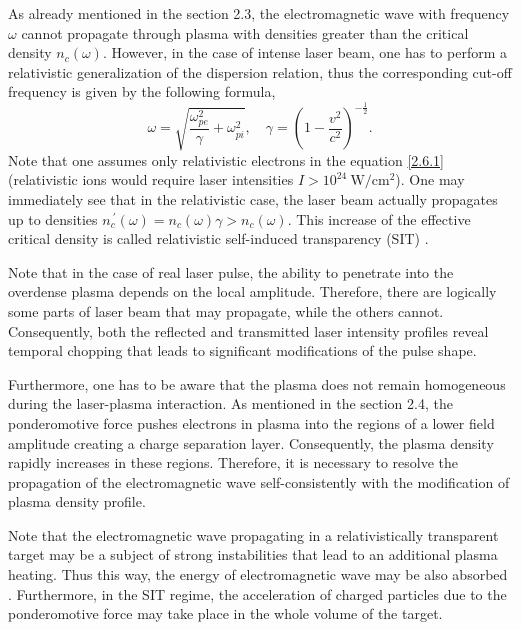 As already mentioned in the section 2.3, the electromagnetic wave with frequency $ \omega $ cannot propagate through plasma with densities greater than the critical density $ n_c \left( \omega \right) $. However, in the case of intense laser beam, one has to perform a relativistic generalization of the dispersion relation, thus the corresponding cut-off frequency is given by the following formula,
\begin{equation}
\label{2.6.1}
\omega = \sqrt{\frac{\omega_{pe}^2}{\gamma} + \omega_{pi}^2}, \quad \gamma = \left( 1 - \frac{v^{2}}{c^2} \right)^{-\frac{1}{2}}.
\end{equation}
Note that one assumes only relativistic electrons in the equation \ref{2.6.1} (relativistic ions would require laser intensities $ I > 10^{24} \ \mathrm{W/cm^2} $). One may immediately see that in the relativistic case, the laser beam actually propagates up to densities $ n_c^{\: \prime} \left( \omega \right) = n_c \left( \omega \right) \gamma > n_c \left( \omega \right) $. This increase of the effective critical density is called relativistic self-induced transparency (SIT) \cite{Fuchs1998, Macchi2013}.

Note that in the case of real laser pulse, the ability to penetrate into the overdense plasma depends on the local amplitude. Therefore, there are logically some parts of laser beam that may propagate, while the others cannot. Consequently, both the reflected and transmitted laser intensity profiles reveal temporal chopping that leads to significant modifications of the pulse shape.

Furthermore, one has to be aware that the plasma does not remain homogeneous during the laser-plasma interaction. As mentioned in the section 2.4, the ponderomotive force pushes electrons in plasma into the regions of a lower field amplitude creating a charge separation layer. Consequently, the plasma density rapidly increases in these regions. Therefore, it is necessary to resolve the propagation of the electromagnetic wave self-consistently with the modification of plasma density profile.

Note that the electromagnetic wave propagating in a relativistically transparent target may be a subject of strong instabilities that lead to an additional plasma heating. Thus this way, the energy of electromagnetic wave may be also absorbed \cite{Macchi2013}. Furthermore, in the SIT regime, the acceleration of charged particles due to the ponderomotive force may take place in the whole volume of the target.


